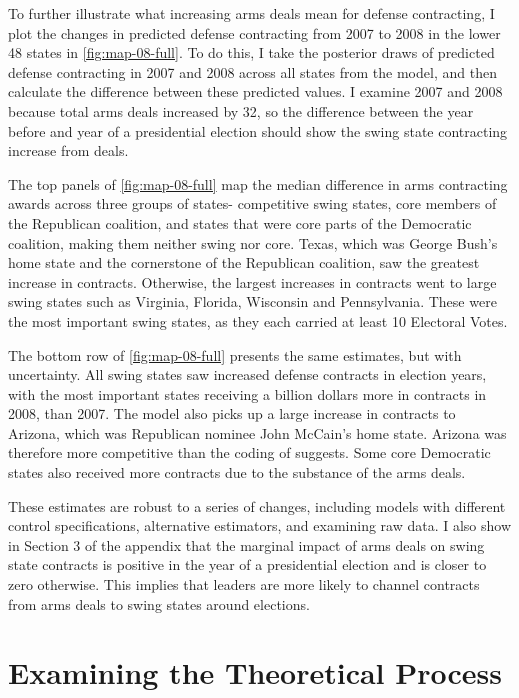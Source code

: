 \documentclass[12pt]{article}
\begin{document}
To further illustrate what increasing arms deals mean for defense contracting, I plot the changes in predicted defense contracting from 2007 to 2008 in the lower 48 states in \autoref{fig:map-08-full}. 
To do this, I take the posterior draws of predicted defense contracting in 2007 and 2008 across all states from the model, and then calculate the difference between these predicted values. 
I examine 2007 and 2008 because total arms deals increased by 32, so the difference between the year before and year of a presidential election should show the swing state contracting increase from deals. 


The top panels of \autoref{fig:map-08-full} map the median difference in arms contracting awards across three groups of states- competitive swing states, core members of the Republican coalition, and states that were core parts of the Democratic coalition, making them neither swing nor core. 
Texas, which was George Bush's home state and the cornerstone of the Republican coalition, saw the greatest increase in contracts.
Otherwise, the largest increases in contracts went to large swing states such as Virginia, Florida, Wisconsin and Pennsylvania. 
These were the most important swing states, as they each carried at least 10 Electoral Votes. 


The bottom row of \autoref{fig:map-08-full} presents the same estimates, but with uncertainty. 
All swing states saw increased defense contracts in election years, with the most important states receiving a billion dollars more in contracts in 2008, than 2007.
The model also picks up a large increase in contracts to Arizona, which was Republican nominee John McCain's home state.
Arizona was therefore more competitive than the coding of \citet{KrinerReeves2015} suggests. 
Some core Democratic states also received more contracts due to the substance of the arms deals. 


These estimates are robust to a series of changes, including models with different control specifications, alternative estimators, and examining raw data.
I also show in Section 3 of the appendix that the marginal impact of arms deals on swing state contracts is positive in the year of a presidential election and is closer to zero otherwise.
This implies that leaders are more likely to channel contracts from arms deals to swing states around elections. 


\section{Examining the Theoretical Process}
\end{document}
